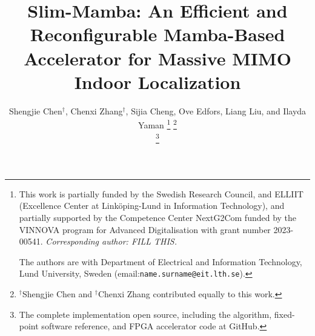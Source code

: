 \documentclass[lettersize,journal]{IEEEtran}
\begin{document}
\title{Slim-Mamba: An Efficient and Reconfigurable Mamba-Based Accelerator for Massive MIMO Indoor Localization}

\author{Shengjie Chen$^{\dagger}$, Chenxi Zhang$^{\dagger}$, Sijia Cheng, Ove Edfors, Liang Liu, and Ilayda Yaman %
\thanks{This work is partially funded by the Swedish Research Council, and ELLIIT (Excellence Center at Linköping-Lund in Information Technology), and partially supported by the Competence Center NextG2Com funded by the VINNOVA program for Advanced Digitalisation with grant number 2023-00541. \textit{Corresponding author: FILL THIS.}

The authors are with Department of Electrical and Information Technology, Lund University, Sweden (email:{\tt\small name.surname@eit.lth.se}).}
 \thanks{$^{\dagger}$Shengjie Chen and $^{\dagger}$Chenxi Zhang contributed equally to this work.}
 
 \thanks{The complete implementation open source, including the algorithm, fixed-point software reference, and FPGA accelerator code at GitHub\cite{slim_mamba}.}
}%



\maketitle
\end{document}
